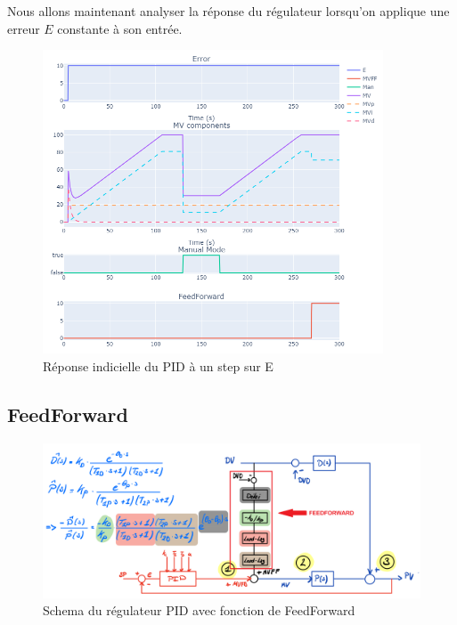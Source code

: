 Nous allons maintenant analyser la réponse du régulateur lorsqu'on applique une erreur $E$ constante à son entrée.
\begin{figure}[H]
    \centering
    \includegraphics[width=0.9\textwidth]{../Plots/PID/PID_Response_error_step.png}
    \caption{Réponse indicielle du PID à un step sur E}
    \label{fig:Step_Response_PID}
\end{figure}

\subsection{FeedForward}

\begin{figure}[h]
    \centering
    \includegraphics[width=\textwidth]{figures/schemaFF.png}
    \caption{Schema du régulateur PID avec fonction de FeedForward}
	\label{fig:schemaFF}
\end{figure}

